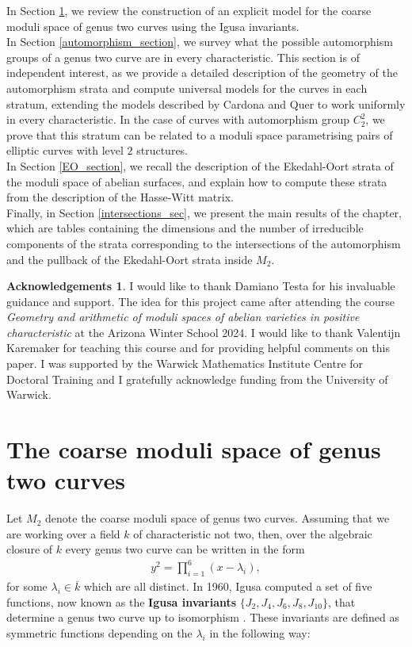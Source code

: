 \documentclass{amsart}
\numberwithin{equation}{section}
\theoremstyle{definition}
\newtheorem*{acknowledgements}{Acknowledgements}
\theoremstyle{remark}
\begin{document}
In Section \ref{M2_section}, we review the construction of an explicit model for the coarse moduli space of genus two curves using the Igusa invariants.\\

In Section \ref{automorphism_section}, we survey what the possible automorphism groups of a genus two curve are in every characteristic.  This section is of independent interest, as we provide a detailed description of the geometry of the automorphism strata and compute universal models for the curves in each stratum, extending the models described by Cardona and Quer \cite{Cardona2007CurvesD12} to work uniformly in every characteristic. In the case of curves with automorphism group $C_2^2$, we prove that this stratum can be related to a moduli space parametrising pairs of elliptic curves with level $2$ structures.\\

In Section \ref{EO_section}, we recall the description of the Ekedahl-Oort strata of the moduli space of abelian surfaces, and explain how to compute these strata from the description of the Hasse-Witt matrix.\\


Finally, in Section \ref{intersections_sec}, we present the main results of the chapter, which are tables containing the dimensions and the number of irreducible components of the strata corresponding to the intersections of the automorphism and the pullback of the Ekedahl-Oort strata inside $M_2$. \\


\begin{acknowledgements}
 I would like to thank Damiano Testa for his invaluable guidance and support. The idea for this project came after attending the course \textit{Geometry and arithmetic of moduli spaces of abelian varieties in positive characteristic} at the Arizona Winter School 2024. I would like to thank Valentijn Karemaker for teaching this course and for providing helpful comments on this paper. I was supported by the Warwick Mathematics Institute Centre for Doctoral Training and I gratefully acknowledge funding from the University of Warwick.
\end{acknowledgements}


\section{The coarse moduli space of genus two curves} \label{M2_section}
Let $M_2$ denote the coarse moduli space of genus two curves. Assuming that we are working over a field $k$ of characteristic not two, then, over the algebraic closure of $k$ every genus two curve can be written in the form
\begin{align} \label{genus2_eq}
y^2=\prod_{i=1}^6(x-\lambda_i),
\end{align}
for some $\lambda_i\in\overline{k}$ which are all distinct. In 1960, Igusa computed a set of five functions, now known as the \textbf{Igusa invariants} $\{J_2, J_4, J_6, J_8, J_{10}\}$, that determine a genus two curve up to isomorphism \cite{Igusa1960ArithmeticTwo}. These invariants are defined as symmetric functions depending on the $\lambda_i$ in the following way: \\
\end{document}
